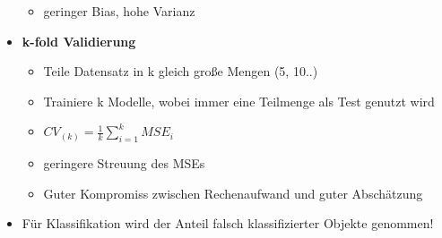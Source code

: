 \documentclass[a4paper]{article}
\begin{document}
\begin{landscape}
\begin{multicols}{3}
\begin{itemize}[noitemsep,nolistsep,leftmargin=*]
\begin{itemize}[noitemsep,nolistsep,leftmargin=*]
                \item geringer Bias, hohe Varianz
            \end{itemize}
            \item \textbf{k-fold Validierung}
            \begin{itemize}[noitemsep,nolistsep,leftmargin=*]
                \item Teile Datensatz in k gleich große Mengen (5, 10..)
                \item Trainiere k Modelle, wobei immer eine Teilmenge als Test genutzt wird
                \item $CV_{(k)} = \frac{1}{k}\sum_{i=1}^k MSE_i$
                \item geringere Streuung des MSEs
                \item Guter Kompromiss zwischen Rechenaufwand und guter Abschätzung
            \end{itemize}
            \item Für Klassifikation wird der Anteil falsch klassifizierter Objekte genommen!
        \end{itemize}




\end{multicols}
\end{landscape}
\end{document}
